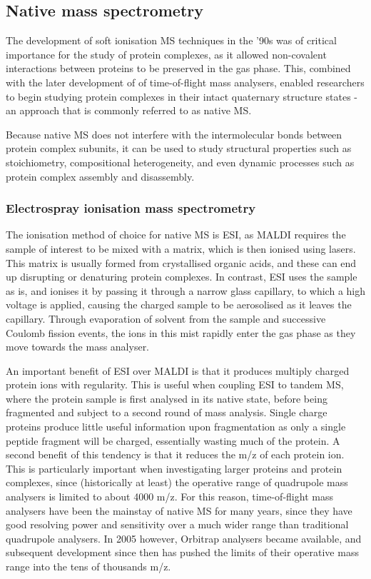 \documentclass[a4paper,11pt,twoside,openright]{scrbook}
\begin{document}
\subsection{Native mass spectrometry}
The development of soft ionisation MS techniques in the '90s was of critical importance for the study of protein complexes, as it allowed non-covalent interactions between proteins to be preserved in the gas phase. This, combined with the later development of of time-of-flight mass analysers, enabled researchers to begin studying protein complexes in their intact quaternary structure states - an approach that is commonly referred to as native MS.

Because native MS does not interfere with the intermolecular bonds between protein complex subunits, it can be used to study structural properties such as stoichiometry, compositional heterogeneity, and even dynamic processes such as protein complex assembly and disassembly.

\subsubsection{Electrospray ionisation mass spectrometry}
The ionisation method of choice for native MS is ESI, as MALDI requires the sample of interest to be mixed with a matrix, which is then ionised using lasers. This matrix is usually formed from crystallised organic acids, and these can end up disrupting or denaturing protein complexes. In contrast, ESI uses the sample as is, and ionises it by passing it through a narrow glass capillary, to which a high voltage is applied, causing the charged sample to be aerosolised as it leaves the capillary. Through evaporation of solvent from the sample and successive Coulomb fission events, the ions in this mist rapidly enter the gas phase as they move towards the mass analyser.

An important benefit of ESI over MALDI is that it produces multiply charged protein ions with regularity. This is useful when coupling ESI to tandem MS, where the protein sample is first analysed in its native state, before being fragmented and subject to a second round of mass analysis. Single charge proteins produce little useful information upon fragmentation as only a single peptide fragment will be charged, essentially wasting much of the protein. A second benefit of this tendency is that it reduces the m/z of each protein ion. This is particularly important when investigating larger proteins and protein complexes, since (historically at least) the operative range of quadrupole mass analysers is limited to about 4000 m/z. For this reason, time-of-flight mass analysers have been the mainstay of native MS for many years, since they have good resolving power and sensitivity over a much wider range than traditional quadrupole analysers. In 2005 however, Orbitrap analysers became available, and subsequent development since then has pushed the limits of their operative mass range into the tens of thousands m/z.
\end{document}
